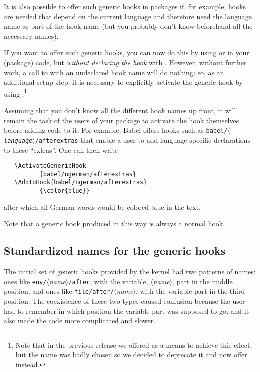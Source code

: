 \documentclass{ltnews}
\providecommand\hook[1]{\texttt{#1}}
\providecommand\meta[1]{$\langle$\textrm{\itshape#1}$\rangle$}
\begin{document}
It is also possible to offer such generic hooks in 
packages if, for example, hooks are needed that depend on the 
current language and therefore need the
language name as part of the hook name (but you probably 
don't know beforehand all the necessary names).

If you want to offer such generic hooks, you can now 
do this by using
 or  in your (package) code, but
\emph{without declaring the hook} with . However, without 
further work, a call to  with an undeclared hook name 
will do 
nothing; so, as an additional setup step, it is necessary to explicitly
activate the generic hook by using .\footnote{Note
  that in the previous release we offered  as a means
  to achieve this effect, but the name was badly chosen so we decided
  to deprecate it and now offer  instead.}

Assuming
that you don't know all the different hook names up front, it will
remain the task of the users of your package to activate the hook
themselves before adding code to it. For example, Babel offers hooks
such as \hook{babel/\meta{language}/afterextras} 
that enable a user
to add language specific declarations to these \enquote{extras}.  One can then write
\begin{verbatim}
   \ActivateGenericHook
          {babel/ngerman/afterextras}
   \AddToHook{babel/ngerman/afterextras}
          {\color{blue}}
\end{verbatim}
after which all German words would be colored blue in the text.

Note that a generic hook produced in this way is always a normal hook.

\subsection{Standardized names for the generic hooks}

The initial set of generic hooks provided by the kernel had
two patterns of names:
ones like
\verb|env/|\meta{name}\verb|/after|, 
with the variable, \meta{name}, part
in the middle position;
and ones like
\verb|file/after/|\meta{name}, with the 
variable part in the third
position.  
%
The coexistence of these two types caused confusion because
the user had to remember in which position the variable part was
supposed to go; and it also made the code more complicated and slower.
\end{document}
